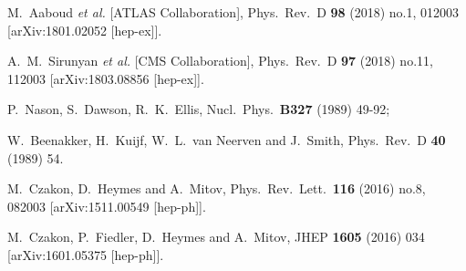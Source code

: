 \documentclass{PoS}
\begin{document}
\begin{thebibliography}{99}

  M.~Aaboud {\it et al.} [ATLAS Collaboration],
  Phys.\ Rev.\ D {\bf 98} (2018) no.1,  012003
  [arXiv:1801.02052 [hep-ex]].

  A.~M.~Sirunyan {\it et al.} [CMS Collaboration],
  Phys.\ Rev.\ D {\bf 97} (2018) no.11,  112003
  [arXiv:1803.08856 [hep-ex]].

  P.~Nason, S.~Dawson, R.~K.~Ellis,
  Nucl.\ Phys.\  {\bf B327 } (1989)  49-92;


W.~Beenakker, H.~Kuijf, W.~L.~van Neerven and J.~Smith,
Phys.\ Rev.\ D {\bf 40} (1989) 54.


  M.~Czakon, D.~Heymes and A.~Mitov,
  Phys.\ Rev.\ Lett.\  {\bf 116} (2016) no.8,  082003
  [arXiv:1511.00549 [hep-ph]].
  
  M.~Czakon, P.~Fiedler, D.~Heymes and A.~Mitov,
  JHEP {\bf 1605} (2016) 034
  [arXiv:1601.05375 [hep-ph]].
  

\end{thebibliography}
\end{document}
